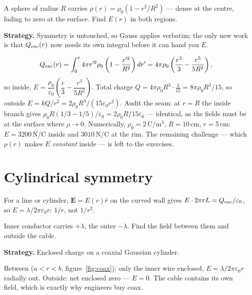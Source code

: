 \begin{example}\label{ex:nonuni}
A sphere of radius $R$ carries $\rho(r)=\rho_0(1-r^{2}/R^{2})$ ---
dense at the centre, fading to zero at the surface. Find $E(r)$ in
both regions.
\par\smallskip
\textbf{Strategy.} Symmetry is untouched, so Gauss applies verbatim;
the only new work is that $Q_{\rm enc}(r)$ now needs its own integral
before it can hand you $E$.
\begin{solution}
\[Q_{\rm enc}(r)=\int_0^{r}4\pi r'^{2}\rho_0\left(1-\frac{r'^{2}}{R^{2}}\right)dr'
=4\pi\rho_0\left(\frac{r^{3}}{3}-\frac{r^{5}}{5R^{2}}\right),\]
so inside,
$E=\dfrac{\rho_0}{\varepsilon_0}\left(\dfrac r3-\dfrac{r^{3}}{5R^{2}}\right)$.
Total charge $Q=4\pi\rho_0R^{3}\cdot\frac{2}{15}=8\pi\rho_0R^{3}/15$,
so outside $E=kQ/r^{2}=2\rho_0R^{3}/(15\varepsilon_0r^{2})$.
Audit the seam: at $r=R$ the inside branch gives
$\rho_0R(1/3-1/5)/\varepsilon_0=2\rho_0R/15\varepsilon_0$ ---
identical, as the fields must be at the surface where $\rho\to0$.
Numerically, $\rho_0=2$\,\textmu C/m$^{3}$, $R=10$\,cm,
$r=5$\,cm: $E=3200$\,N/C inside and $3010$\,N/C at the rim.
The remaining challenge --- which $\rho(r)$ makes $E$ \emph{constant}
inside --- is left to the exercises. \checkmark
\end{solution}
\end{example}

\section{Cylindrical symmetry}\label{sec:ga-cyl}

For a line or cylinder, $\mathbf E=E(r)\hat r$ on the curved wall gives
$E\cdot2\pi rL=Q_{\rm enc}/\varepsilon_0$, so
$E=\lambda/2\pi\varepsilon_0r$: $1/r$, not $1/r^{2}$.

\begin{example}\label{ex:coax}
Inner conductor carries $+\lambda$, the outer $-\lambda$. Find the
field between them and outside the cable.
\par\smallskip
\textbf{Strategy.} Enclosed charge on a coaxial Gaussian cylinder.
\begin{solution}
Between ($a<r<b$, figure~\ref{fig:coax}): only the inner wire enclosed,
$E=\lambda/2\pi\varepsilon_0r$ radially out.
Outside: net enclosed zero --- $E=0$. The cable contains its own field,
which is exactly why engineers buy coax. \checkmark
\end{solution}
\end{example}

